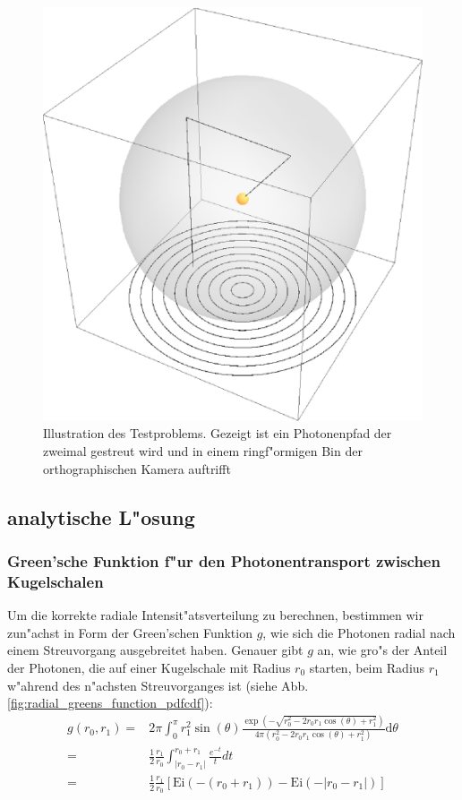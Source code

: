 	\begin{figure}
			\centering
			\includegraphics[height=0.3\textheight]{testproblem_illustration.eps}
			\caption{Illustration des Testproblems. Gezeigt ist ein Photonenpfad der zweimal gestreut wird und in einem ringf"ormigen Bin der orthographischen Kamera auftrifft}
			\label{fig:testproblem_sketch}
	\end{figure}

	
	\subsection{analytische L"osung}\label{subsec:homsphere_analytic_solution}
	\subsubsection{Green'sche Funktion f"ur den Photonentransport zwischen Kugelschalen}
	Um die korrekte radiale Intensit"atsverteilung zu berechnen, bestimmen wir zun"achst in Form der Green'schen Funktion $g$, wie sich die Photonen radial nach einem Streuvorgang ausgebreitet haben.
	Genauer gibt $g$ an, wie gro"s der Anteil der Photonen, die auf einer Kugelschale mit Radius $r_0$ starten, beim Radius $r_1$ w"ahrend des n"achsten Streuvorganges ist (siehe Abb. \ref{fig:radial_greens_function_pdfcdf}):
	\begin{align*}
		g(r_0,r_1) =& 2 \pi \int_0^\pi r_1^2 \sin(\theta) \frac{\exp\left(-\sqrt{r_0^2-2 r_0 r_1 \cos(\theta)+r_1^2}\right)}{4 \pi (r_0^2-2 r_0 r_1 \cos(\theta)+r_1^2)} \text{d}\theta \\
		=& \frac{1}{2}\frac{r_1}{r_0} \int_{|r_0-r_1|}^{r_0+r_1} \frac{e^{-t}}{t} dt \\
		=& \frac{1}{2}\frac{r_1}{r_0}\left[\text{Ei}(-(r_0+r_1)) - \text{Ei}(-|r_0-r_1|)\right]
	\end{align*}
	
